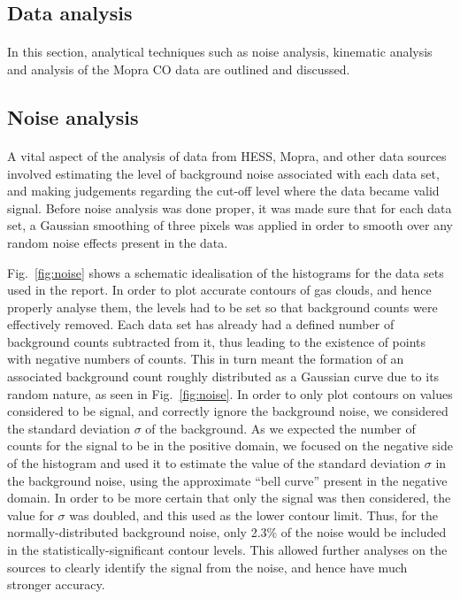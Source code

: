 \documentclass[a4paper, titlepage, oneside]{article}
\begin{document}
\begin{multicols}{2}
\section{Data analysis} %
\paragraph{}
In this section, analytical techniques such as noise analysis, kinematic analysis and analysis of the Mopra CO data are outlined and discussed.

\subsection{Noise analysis}
\paragraph{}
A vital aspect of the analysis of data from HESS, Mopra, and other data sources involved estimating the level of background noise associated with each data set, and making judgements regarding the cut-off level where the data became valid signal. Before noise analysis was done proper, it was made sure that for each data set, a Gaussian smoothing of three pixels was applied in order to smooth over any random noise effects present in the data.

Fig.~\ref{fig:noise} shows a schematic idealisation of the histograms for the data sets used in the report. In order to plot accurate contours of gas clouds, and hence properly analyse them, the levels had to be set so that background counts were effectively removed. Each data set has already had a defined number of background counts subtracted from it, thus leading to the existence of points with negative numbers of counts. This in turn meant the formation of an associated background count roughly distributed as a Gaussian curve due to its random nature, as seen in Fig.~\ref{fig:noise}. In order to only plot contours on values considered to be signal, and correctly ignore the background noise, we considered the standard deviation \(\sigma\) of the background. As we expected the number of counts for the signal to be in the positive domain, we focused on the negative side of the histogram and used it to estimate the value of the standard deviation \(\sigma\) in the background noise, using the approximate ``bell curve'' present in the negative domain. In order to be more certain that only the signal was then considered, the value for \(\sigma\) was doubled, and this used as the lower contour limit. Thus, for the normally-distributed background noise, only 2.3\% of the noise would be included in the statistically-significant contour levels. This allowed further analyses on the sources to clearly identify the signal from the noise, and hence have much stronger accuracy.


\end{multicols}
\end{document}
